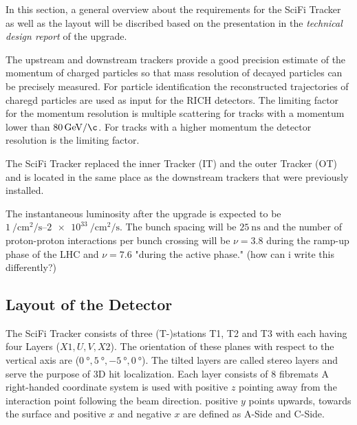 In this section, a general overview about the requirements for the SciFi Tracker as well as the layout will be discribed based on the presentation in the \textit{technical design report}\cite{scifiInfo} of the upgrade.

The upstream and downstream trackers provide a good precision estimate of the momentum of charged particles so that mass resolution of decayed particles can be precisely measured. %
For particle identification the reconstructed trajectories of charegd particles are used as input for the RICH detectors.
The limiting factor for the momentum resolution is multiple scattering for tracks with a momentum lower than $\SI{80}{\giga\electronvolt\per\c}$. For tracks with a higher momentum the detector resolution is the limiting factor.

The SciFi Tracker replaced the inner Tracker (IT) and the outer Tracker (OT) and is located in the same place as the downstream trackers that were previously installed.

The instantaneous luminosity after the upgrade is expected to be $\SIrange{1}{2e33}{\per\centi\metre\squared\per\second}$. The bunch spacing will be $\SI{25}{\nano\second}$ and the number of proton-proton interactions per bunch crossing will be $\nu = 3.8$ during the ramp-up phase of the LHC and $\nu = 7.6$ "during the active phase." (how can i write this differently?)

\subsection{Layout of the Detector}
The SciFi Tracker consists of three (T-)stations T1, T2 and T3 with each having four Layers ($X1, U, V, X2$). The orientation of these planes with respect to the vertical axis are ($\SI{0}{\degree}, \SI{+5}{\degree}, \SI{-5}{\degree}, \SI{0}{\degree}$).
The tilted layers are called stereo layers and serve the purpose of 3D hit localization.
Each layer consists of 8 fibremats
A right-handed coordinate system is used with positive $z$ pointing away from the interaction point following the beam direction. positive $y$ points upwards, towards the surface and positive $x$ and negative $x$ are defined as A-Side and C-Side\cite{scifiInfo}.


